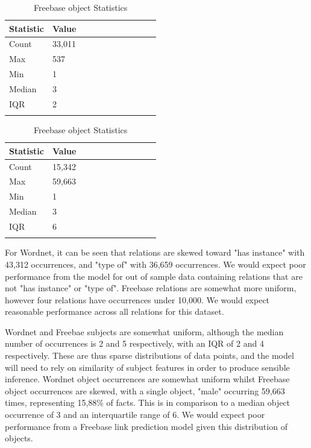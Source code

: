 \begin{table}[H]
	\parbox{.5\linewidth}{
		\centering
		\begin{tabular}{lllllllllll}
  			\textbf{Statistic} & \textbf{Value}  \\
  			\hline
			Count & 33,011 \\
			Max & 537 \\
			Min & 1 \\
  			Median & 3 \\
  			IQR & 2 \\
				&
		\end{tabular}
		\caption{WordNet object statistics}
		}
	\hfill
	\parbox{.5\linewidth}{
		\centering
		\begin{tabular}{lllllllllll}
  			\textbf{Statistic} & \textbf{Value}  \\
  			\hline
			Count & 15,342 \\
			Max & 59,663 \\
			Min & 1 \\
  			Median & 3 \\
  			IQR & 6 \\
				&
		\end{tabular}
		\caption{Freebase object Statistics}
		}
\end{table}

\noindent For Wordnet, it can be seen that relations are skewed toward "has instance" with 43,312 occurrences, and "type of" with 36,659 occurrences. We would expect poor performance from the model for out of sample data containing relations that are not "has instance" or "type of". Freebase relations are somewhat more uniform, however four relations have occurrences under 10,000. We would expect reasonable performance across all relations for this dataset. \par

\noindent Wordnet and Freebae subjects are somewhat uniform, although the median number of occurrences is 2 and 5 respectively, with an IQR of 2 and 4 respectively. These are thus sparse distributions of data points, and the model will need to rely on  similarity of subject features in order to produce sensible inference. Wordnet object occurrences are somewhat uniform whilst Freebase object occurrences are skewed, with a single object, "male" occurring 59,663 times, representing 15,88\% of facts. This is in comparison to a median object occurrence of 3 and an interquartile range of 6. We would expect poor performance from a Freebase link prediction model given this distribution of objects. 


